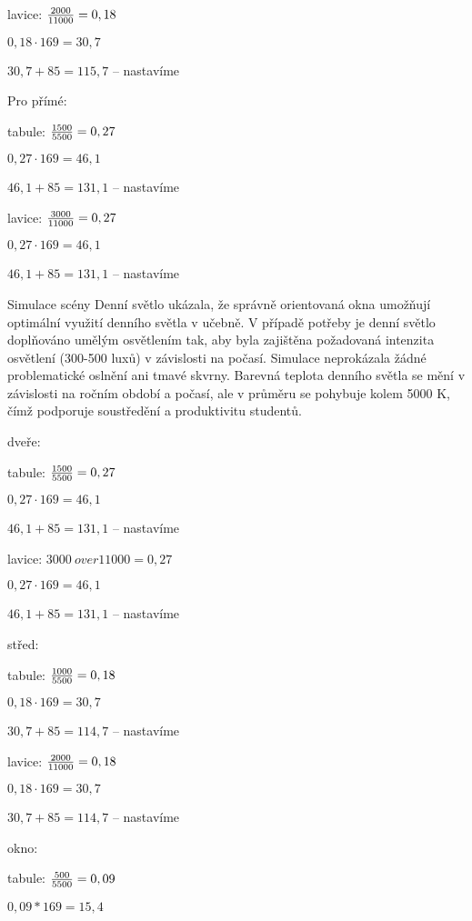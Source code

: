 lavice: ${2000 \over 11000} = 0,18$

        ${0,18 \cdot 169} = 30,7$

        $30,7 + 85 = 115,7$ – nastavíme

Pro přímé:

tabule: ${1500 \over 5500} = 0,27$

        ${0,27 \cdot 169} = 46,1$

        $46,1 + 85 = 131,1$ – nastavíme

lavice: ${3000 \over 11000} = 0,27$

        ${0,27 \cdot 169} = 46,1$

        $46,1 + 85 = 131,1$ – nastavíme


Simulace scény Denní světlo ukázala, že správně orientovaná okna umožňují optimální využití denního
světla v učebně. V případě potřeby je denní světlo doplňováno umělým osvětlením tak, aby byla zajištěna požadovaná
intenzita osvětlení (300-500 luxů) v závislosti na počasí. Simulace neprokázala žádné
problematické oslnění ani tmavé skvrny. Barevná teplota denního světla se mění v závislosti na ročním období a počasí,
ale v průměru se pohybuje kolem 5000 K, čímž podporuje soustředění a produktivitu studentů.

{\sbf dveře:}

tabule: ${1500 \over 5500} = 0,27$

        ${0,27 \cdot 169} = 46,1$

        $46,1 + 85 = 131,1$ – nastavíme

lavice: ${3000 \ over 11000} = 0,27$

        ${0,27 \cdot 169} = 46,1$

        $46,1 + 85 = 131,1$ – nastavíme

{\sbf střed:}


tabule: ${1000 \over 5500} = 0,18$

        ${0,18 \cdot 169} = 30,7$

        $30,7 + 85 = 114,7$ – nastavíme

lavice: ${2000 \over 11000} = 0,18$

        ${0,18 \cdot 169} = 30,7$

        $30,7 + 85 = 114,7$ – nastavíme

{\sbf okno:}


tabule: ${500 \over 5500} = 0,09$

        ${0,09 * 169} = 15,4$

